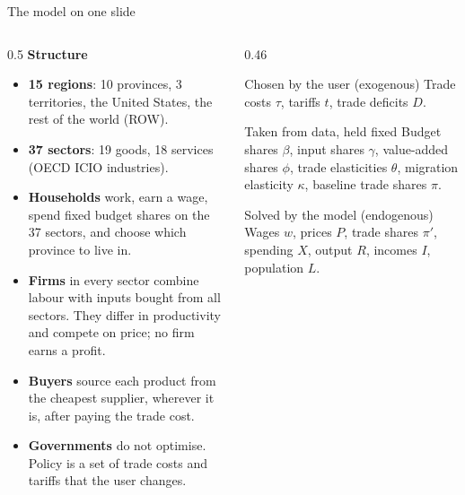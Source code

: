 \documentclass[aspectratio=169,9pt,t]{beamer}
\newcommand{\key}[1]{\textbf{\color{ipnavy}#1}}
\begin{document}
\begin{frame}{The model on one slide}
  \begin{columns}[T]
    \begin{column}{0.5\textwidth}
      \textbf{Structure}
      \begin{itemize}
        \item \key{15 regions}: 10 provinces, 3 territories, the United
              States, the rest of the world (ROW).
        \item \key{37 sectors}: 19 goods, 18 services (OECD ICIO industries).
        \item \key{Households} work, earn a wage, spend fixed budget shares
              on the 37 sectors, and choose which province to live in.
        \item \key{Firms} in every sector combine labour with inputs bought
              from all sectors. They differ in productivity and compete on
              price; no firm earns a profit.
        \item \key{Buyers} source each product from the cheapest supplier,
              wherever it is, after paying the trade cost.
        \item \key{Governments} do not optimise. Policy is a set of trade
              costs and tariffs that the user changes.
      \end{itemize}
    \end{column}
    \begin{column}{0.46\textwidth}
      \begin{block}{Chosen by the user (exogenous)}
        \small Trade costs $\tau$, tariffs $t$, trade deficits $D$.
      \end{block}
      \begin{block}{Taken from data, held fixed}
        \small Budget shares $\beta$, input shares $\gamma$, value-added
        shares $\phi$, trade elasticities $\theta$, migration elasticity
        $\kappa$, baseline trade shares $\pi$.
      \end{block}
      \begin{block}{Solved by the model (endogenous)}
        \small Wages $w$, prices $P$, trade shares $\pi'$, spending $X$,
        output $R$, incomes $I$, population $L$.
      \end{block}
    \end{column}
  \end{columns}
\end{frame}
\end{document}
